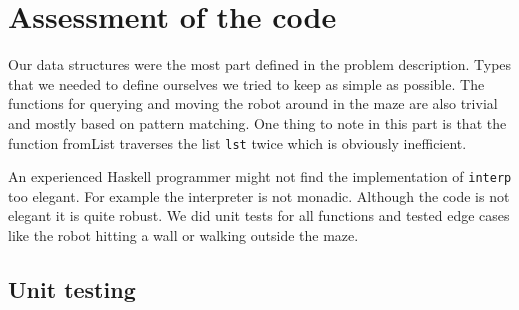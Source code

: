\documentclass[a4paper,10pt]{article}
\begin{document}
\section{Assessment of the code}

Our data structures were the most part defined in the problem description. Types that we needed to define ourselves we tried to keep as simple as possible. The functions for querying and moving the robot around in the maze are also trivial and mostly based on pattern matching. One thing to note in this part is that the function fromList traverses the list \verb=lst= twice which is obviously inefficient.

An experienced Haskell programmer might not find the implementation of \verb=interp= too elegant. For example the interpreter is not monadic. Although the code is not elegant it is quite robust. We did unit tests for all functions and tested edge cases like the robot hitting a wall or walking outside the maze.

\subsection{Unit testing}
\end{document}
